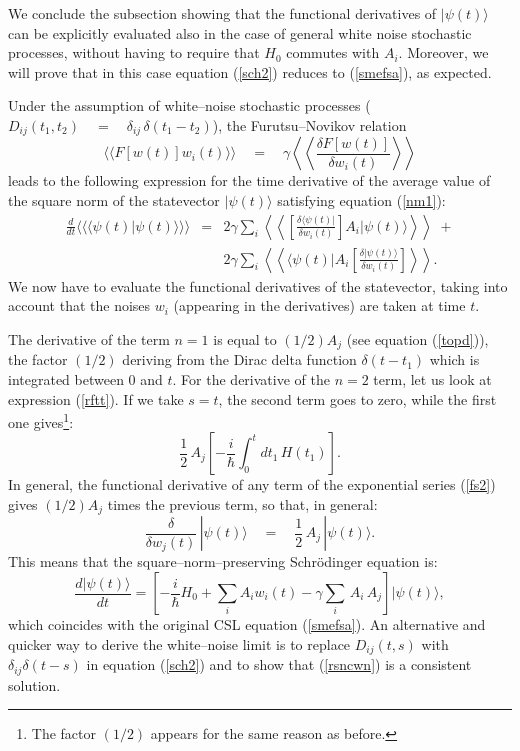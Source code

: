\documentclass[10pt,a4paper]{article}
\newcommand{\llangle}{\langle\!\langle}
\newcommand{\rrangle}{\rangle\!\rangle}
\newcommand{\LLangle}{\left\langle\!\!\!\left\langle}
\newcommand{\RRangle}{\right\rangle\!\!\!\right\rangle}
\begin{document}
We conclude the subsection showing that the functional derivatives
of $|\psi(t)\rangle$ can be explicitly evaluated also in the case
of general white noise stochastic processes,  without having to
require that $H_{0}$ commutes with $A_{i}$. Moreover, we will
prove that in this case equation (\ref{sch2}) reduces to
(\ref{smefsa}), as expected.

Under the assumption of white--noise stochastic processes
($D_{ij}(t_{1}, t_{2}) \quad = \quad \delta_{ij}\,\delta(t_{1} -
t_{2})$), the Furutsu--Novikov relation
\begin{equation} \label{fnwn}
\llangle F[w(t)]w_{i}(t) \rrangle \quad = \quad \gamma \LLangle
\frac{\delta F[w(t)]}{\delta w_{i}(t)} \RRangle
\end{equation}
leads to the following expression for the time derivative of the
average value of the square norm of the statevector
$|\psi(t)\rangle$ satisfying equation (\ref{nm1}):
\begin{eqnarray} \label{ie2wn}
\frac{d}{dt}\llangle\langle\psi(t)|\psi(t)\rangle\rrangle & = &
2\gamma \sum_{i} \LLangle \left[ \frac{\delta
\langle\psi(t)|}{\delta w_{i}(t)}\right]
A_{i}|\psi(t)\rangle\RRangle  \; + \nonumber \\  &  & 2\gamma
\sum_{i} \LLangle \langle\psi(t)|A_{i} \left[ \frac{\delta
|\psi(t)\rangle}{\delta w_{i}(t)} \right]\RRangle.
\end{eqnarray}
We now have to evaluate the functional derivatives of the
statevector, taking into account that the noises $w_{i}$
(appearing in the derivatives) are taken at time $t$.

The derivative of the term $n=1$ is equal to $(1/2)A_{j}$ (see
equation (\ref{topd})), the factor $(1/2)$ deriving from the Dirac
delta function $\delta(t - t_{1})$ which is integrated between $0$
and $t$. For the derivative of the $n=2$ term, let us look at
expression (\ref{rftt}). If we take $s=t$, the second term goes to
zero, while the first one gives\footnote{The factor $(1/2)$
appears for the same reason as before.}:
\begin{equation}
\frac{1}{2}\, A_{j} \left[ -\frac{i}{\hbar} \int_{0}^{t} dt_{1}\,
H(t_{1}) \right].
\end{equation}
In general, the functional derivative of any term of the
exponential series (\ref{fs2}) gives $(1/2)A_{j}$ times the
previous term, so that, in general:
\begin{equation} \label{rsncwn}
\frac{\delta}{\delta w_{j}(t)}\, |\psi(t)\rangle \quad = \quad
\frac{1}{2}\,A_{j}\, |\psi(t)\rangle.
\end{equation}
This means that the square--norm--preserving Schr\"odinger
equation is:
\begin{equation}\label{sch3}
\frac{d|\psi(t)\rangle}{dt} =  \left[ -\frac{i}{\hbar} H_{0} +
\sum_{i} A_{i}w_{i}(t) - \gamma \sum_{i} \,A_{i}\, A_{j} \right]
|\psi(t)\rangle,
\end{equation}
which coincides with the original CSL equation (\ref{smefsa}). An
alternative and quicker way to derive the white--noise limit is to
replace $D_{ij}(t,s)$ with $\delta_{ij} \delta(t-s)$ in equation
(\ref{sch2}) and to show that (\ref{rsncwn}) is a consistent
solution.
\end{document}

